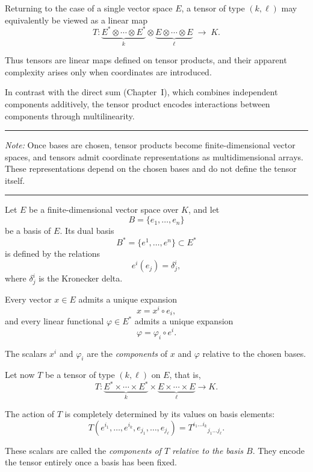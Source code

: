 \medskip

Returning to the case of a single vector space \(E\), a tensor of type
\((k,\ell)\) may equivalently be viewed as a linear map
\[
T :
\underbrace{E^* \otimes \cdots \otimes E^*}_{k}
\otimes
\underbrace{E \otimes \cdots \otimes E}_{\ell}
\;\longrightarrow\; K.
\]

\medskip

Thus tensors are linear maps defined on tensor products, and their apparent
complexity arises only when coordinates are introduced.

\medskip

In contrast with the direct sum (Chapter~I), which combines independent
components additively, the tensor product encodes interactions between
components through multilinearity.

\bigskip
\hrule
\medskip

\textit{Note:} Once bases are chosen, tensor products become finite-dimensional
vector spaces, and tensors admit coordinate representations as multidimensional
arrays. These representations depend on the chosen bases and do not define the
tensor itself.

\medskip
\hrule
\bigskip

Let $E$ be a finite-dimensional vector space over $K$, and let
\[
B = \{ e_1, \dots, e_n \}
\]
be a basis of $E$. Its dual basis
\[
B^* = \{ e^1, \dots, e^n \}
\subset E^*
\]
is defined by the relations
\[
e^i(e_j) = \delta^i_j,
\]
where $\delta^i_j$ is the Kronecker delta.

\medskip

Every vector $x \in E$ admits a unique expansion
\[
x = x^i \circ e_i,
\]
and every linear functional $\varphi \in E^*$ admits a unique expansion
\[
\varphi = \varphi_i \circ e^i.
\]

The scalars $x^i$ and $\varphi_i$ are the \emph{components} of $x$ and
$\varphi$ relative to the chosen bases.

\medskip

Let now $T$ be a tensor of type $(k,\ell)$ on $E$, that is,
\[
T : \underbrace{E^* \times \cdots \times E^*}_{k}
\times
\underbrace{E \times \cdots \times E}_{\ell}
\longrightarrow K.
\]

The action of $T$ is completely determined by its values on basis elements:
\[
T(e^{i_1}, \dots, e^{i_k}, e_{j_1}, \dots, e_{j_\ell})
= T^{i_1 \dots i_k}{}_{j_1 \dots j_\ell}.
\]

These scalars are called the \emph{components of $T$ relative to the basis $B$}.
They encode the tensor entirely once a basis has been fixed.

